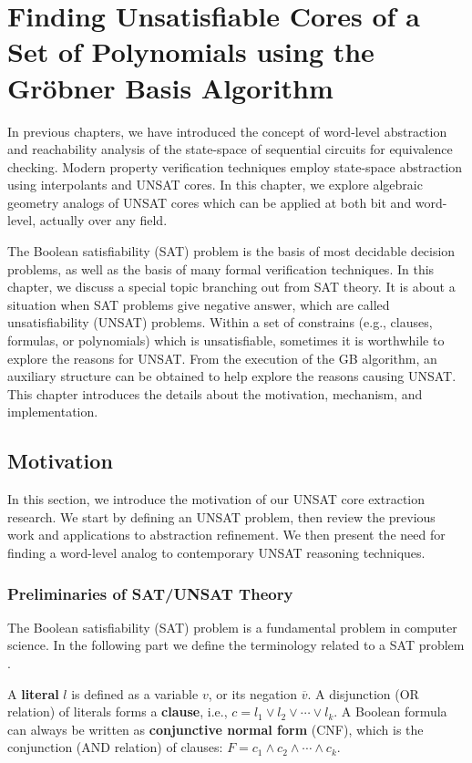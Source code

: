 \chapter{Finding Unsatisfiable Cores of a Set of Polynomials using the Gr\"obner Basis Algorithm}
\label{ch:UNSAT}
In previous chapters, we have introduced the concept of word-level abstraction and 
reachability analysis of the state-space of sequential circuits for equivalence checking.
Modern property verification techniques employ state-space abstraction using interpolants and UNSAT 
cores. In this chapter, we explore algebraic geometry analogs of UNSAT cores which can be 
applied at both bit and word-level, actually over any field.

The Boolean satisfiability (SAT) problem is the basis of 
most decidable decision problems, as well as the basis of many formal verification techniques. 
In this chapter, we discuss a special topic branching out from SAT theory. It is about a situation 
when SAT problems give negative answer, which are called unsatisfiability (UNSAT) problems. Within 
a set of constrains (e.g., clauses, formulas, or polynomials) which is unsatisfiable, sometimes 
it is worthwhile to explore the reasons for UNSAT. From the execution of the GB algorithm, 
an auxiliary structure can be obtained to help explore the reasons causing UNSAT. This chapter introduces the 
details about the motivation, mechanism, and implementation. 

\section{Motivation}
In this section, we introduce the motivation of our UNSAT core extraction research. We
start by defining an UNSAT problem, then review the previous work and applications 
to abstraction refinement. We then present the need for finding a word-level 
analog to contemporary UNSAT reasoning techniques.

\subsection{Preliminaries of SAT/UNSAT Theory}
The Boolean satisfiability (SAT) problem is a fundamental problem in computer science.
In the following part we define the terminology related to a SAT problem \cite{anaICCAD}.

\begin{Definition}
A {\bf literal} $l$ is defined as a variable $v$, or its negation $\overline{v}$. A disjunction (OR relation)
of literals forms a {\bf clause}, i.e., $c = l_1\lor l_2 \lor \cdots \lor l_k$. 
A Boolean formula can always be written as {\bf conjunctive normal form} (CNF),
which is the conjunction (AND relation) of clauses: $F = c_1\land c_2\land\cdots\land c_k$.
\end{Definition}

